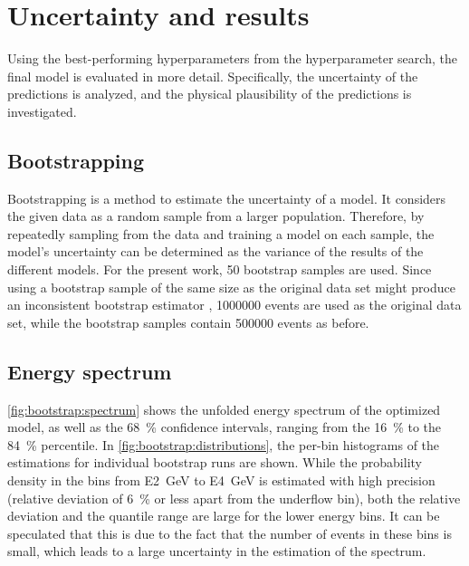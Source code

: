 \section{Uncertainty and results}
Using the best-performing hyperparameters from the hyperparameter search, %
the final model is evaluated in more detail.
Specifically,
  the uncertainty of the predictions is analyzed, %
  and the physical plausibility of the predictions is investigated.


\subsection{Bootstrapping}
Bootstrapping \cite{bootstrap} is a method to estimate the uncertainty of a model.
It considers the given data as a random sample from a larger population.
Therefore,
by repeatedly sampling from the data and training a model on each sample,
the model's uncertainty can be determined
as the variance of the results of the different models.
%
For the present work, \num{50} bootstrap samples are used. %
Since using a bootstrap sample of the same size as the original data set
might produce an inconsistent bootstrap estimator \cite{bootstrap_samplesize},
\num{1000000} events are used as the original data set,
while the bootstrap samples contain \num{500000} events as before.


\subsection{Energy spectrum}
\autoref{fig:bootstrap:spectrum} shows the unfolded energy spectrum of the optimized model,
as well as the \SI{68}{\percent} confidence intervals,
  ranging from the \SI{16}{\percent} to the \SI{84}{\percent} percentile.
In \autoref{fig:bootstrap:distributions},
the per-bin histograms of the estimations for individual bootstrap runs are shown.
While the probability density in the bins from \SI{E2}{\giga\electronvolt} to \SI{E4}{\giga\electronvolt} is estimated with high precision
  (relative deviation of \SI{6}{\percent} or less apart from the underflow bin),
both the relative deviation and the quantile range are large for the lower energy bins.
It can be speculated that this is due to the fact that the number of events in these bins is small,
which leads to a large uncertainty in the estimation of the spectrum.

